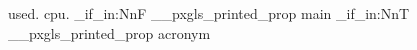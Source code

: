 \documentclass{article}
\begin{document}
\gls{used}. \gls{cpu}.
\pxPrintGlossary
\ExplSyntaxOn
\prop_if_in:NnF \g__pxgls_printed_prop {main}{}
\prop_if_in:NnT \g__pxgls_printed_prop {acronym}{}
\ExplSyntaxOff
\pxPrintGlossary
\end{document}
